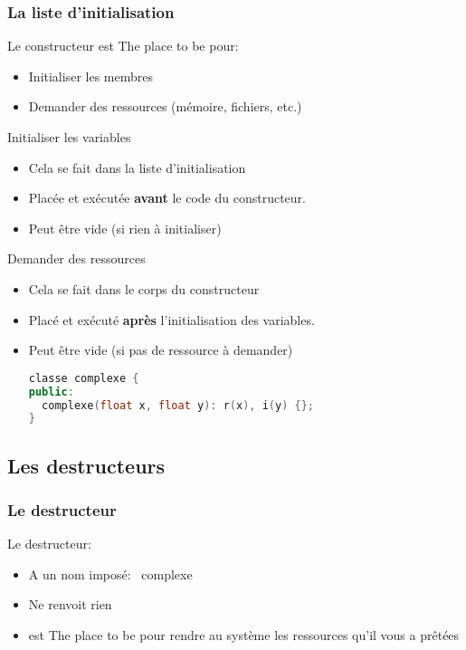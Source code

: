 \documentclass{beamer}
\begin{document}
\begin{frame}[fragile=singleslide,shrink=20]
\frametitle {La liste d'initialisation}
Le constructeur est The place to be pour:
\begin{itemize}
\item{Initialiser les membres}
\item{Demander des ressources (mémoire, fichiers, etc.)}
\end{itemize}

\begin{block}{Initialiser les variables}
\begin{itemize}
\item{Cela se fait dans la liste d'initialisation}
\item{Placée et exécutée \textbf{avant} le code du constructeur.}
\item{Peut être vide (si rien à initialiser)}
\end{itemize}
\end{block}

\begin{block}{Demander des ressources}
\begin{itemize}
\item{Cela se fait dans le corps du constructeur}
\item{Placé et exécuté \textbf{après} l'initialisation des variables.}
\item{Peut être vide (si pas de ressource à demander)}
\begin{lstlisting}[language=c++]
classe complexe {
public:
  complexe(float x, float y): r(x), i(y) {};
}
\end{lstlisting}
\end{itemize}
\end{block}
\end{frame}

\subsection{Les destructeurs}
\begin{frame}[fragile=singleslide,shrink=20]
\frametitle {Le destructeur}
Le destructeur:
\begin{itemize}
\item{A un nom imposé: ~complexe}
\item{Ne renvoit rien}
\item{est The place to be pour rendre au système les ressources qu'il vous a prêtées}
\end{itemize}
\end{frame}
\end{document}
